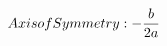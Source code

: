 \documentclass[preview]{standalone}
\begin{document}
\begin{align*}
\special{dvisvgm:raw <g id='unique000'>}Axis of Symmetry: -\frac{b}{2a}\special{dvisvgm:raw </g>}
\end{align*}
\end{document}
